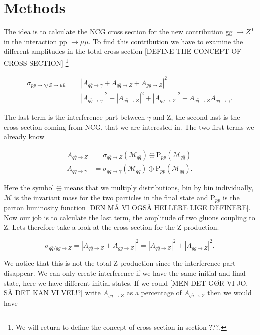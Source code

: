 \section{Methods}
The idea is to calculate the NCG cross section for the new contribution gg $\rightarrow Z^0$ in the interaction pp $\rightarrow \mu \bar \mu$. To find this contribution we have to examine the different amplitudes in the total cross section [DEFINE THE CONCEPT OF CROSS SECTION]  \footnote{We will return to define the concept of cross section in section ???.}

\begin{align}
\sigma_{pp \rightarrow \gamma/ Z \rightarrow \mu \bar \mu} &= |A_{q \bar q \rightarrow \gamma} + A_{q \bar q \rightarrow Z} + A_{gg \rightarrow Z}|^{2} \nonumber \\
&= |A_{q \bar q \rightarrow \gamma}|^{2} + |A_{q \bar q \rightarrow Z}|^ {2} + |A_{gg \rightarrow Z}|^{2} + A_{q \bar q \rightarrow Z }A_{qq \rightarrow \gamma}.
\end{align}

The last term is the interference part between $\gamma$ and Z, the second last is the cross section coming from NCG, that we are interested in. The two first terms we already know

\begin{align}
A_{q \bar q \rightarrow Z} &= \sigma_{q \bar q \rightarrow Z} (\mathcal{M}_{q \bar q}) \oplus \textrm{P}_{pp}(\mathcal{M}_{q \bar q}) \nonumber \\ 
A_{q \bar q \rightarrow \gamma} &= \sigma_{q \bar q \rightarrow  \gamma}( \mathcal{M}_{q \bar q}) \oplus \textrm{P}_{pp}(\mathcal{M}_{q \bar q}).
\end{align}

Here the symbol $\oplus$ means that we multiply distributions, bin by bin individually, $\mathcal{M}$ is the invariant mass for the two particles in the final state and P$_{pp}$ is the parton luminosity function [DEN MÅ VI OGSÅ HELLERE LIGE DEFINERE]. Now our job is to calculate the last term, the amplitude of two gluons coupling to Z. Lets therefore take a look at the cross section for the Z-production.

\begin{equation}
\sigma_{q \bar q/gg \rightarrow Z} = |A_{q \bar q \rightarrow Z} + A_{gg \rightarrow Z}|^{2}=|A_{q \bar q \rightarrow Z}|^{2}+|A_{gg \rightarrow Z}|^{2}.
\end{equation}

We notice that this is not the total Z-production since the interference part disappear. We can only create interference if we have the same initial and final state, here we have different initial states. If we could [MEN DET GØR VI JO, SÅ DET KAN VI VEL!?] write $A_{gg \rightarrow Z}$ as a percentage of $A_{q \bar q \rightarrow Z}$ then we would have

